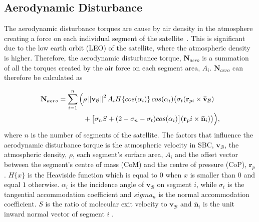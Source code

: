 \subsection{Aerodynamic Disturbance}
The aerodynamic disturbance torques are cause by air density in the atmosphere creating a force on each individual segment of the satellite~\cite{Steyn2014}. This is significant due to the low earth orbit (LEO) of the satellite, where the atmospheric density is higher. Therefore, the aerodynamic disturbance torque, $\mathbf{N}_{aero}$ is a summation of all the torques created by the air force on each segment area, $A_i$. $\mathbf{N}_{aero}$ can therefore be calculated as

\begin{equation}
\begin{aligned}
\mathbf{N}_{aero} = \sum_{i=1}^{n}\Big(& \rho \norm{\mathbf{v}_{\mathcal{B}}}^2 A_i H \{cos(\alpha_i)\} \, cos(\alpha_i) \big(\sigma_t (\mathbf{r}_{pi} \times \mathbf{\bar{v}}_{\mathcal{B}}) \\
					 & + \big[ \sigma_nS + (2 - \sigma_n - \sigma_t) cos(\alpha_i)\big] (\mathbf{r}_pi \times \mathbf{\bar{n}}_i) \big) \vphantom{\norm{\mathbf{v}_{\mathcal{B}}}^2}\Big),
\end{aligned}
\end{equation}
where $n$ is the number of segments of the satellite. The factors that influence the aerodynamic disturbance torque is the atmospheric velocity in SBC, $\mathbf{v}_{\mathcal{B}}$, the atmospheric density, $\rho$, each segment's surface area, $A_i$ and the offset vector between the segment's centre of mass (CoM) and the centre of pressure (CoP), $\mathbf{r}_p$. $H\{x\}$ is the Heaviside function which is equal to $0$ when $x$ is smaller than $0$ and equal $1$ otherwise. $\alpha_i$ is the incidence angle of $\mathbf{v}_{\mathcal{B}}$ on segment $i$, while $\sigma_t$ is the tangential accommodation coefficient and $sigma_n$ is the normal accommodation coefficient. $S$ is the ratio of molecular exit velocity to $\mathbf{v}_{\mathcal{B}}$ and $\mathbf{\bar{n}}_i$ is the unit inward normal vector of segment $i$ \cite{JansevanVuuren2015}.


